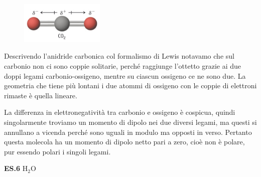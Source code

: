 \hspace{0.5cm}\begin{minipage}{0.2\textwidth}
    \begin{figure}[H]
    \includegraphics[width=4cm]{immagini/CO_2.png}
    \end{figure}
    \end{minipage} \hfill
    \begin{minipage}{0.65\textwidth}
    \vspace{0.4cm}Descrivendo l'anidride carbonica col formalismo di Lewis notavamo che sul carbonio non ci sono coppie solitarie, perché raggiunge l'ottetto grazie ai due doppi legami carbonio-ossigeno, mentre su ciascun ossigeno ce ne sono due. La geometria che tiene più lontani i due atommi di ossigeno con le coppie di elettroni rimaste è quella lineare.
    
    La differenza in elettronegatività tra carbonio e ossigeno è cospicua, quindi singolarmente troviamo un momento di dipolo nei due diversi legami, ma questi si annullano a vicenda perché sono uguali in modulo ma opposti in verso. Pertanto questa molecola ha un momento di dipolo netto pari a zero, cioè non è polare, pur essendo polari i singoli legami.
    \end{minipage}

\vspace{0.2cm}\textbf{ES.6} H$_2$O

